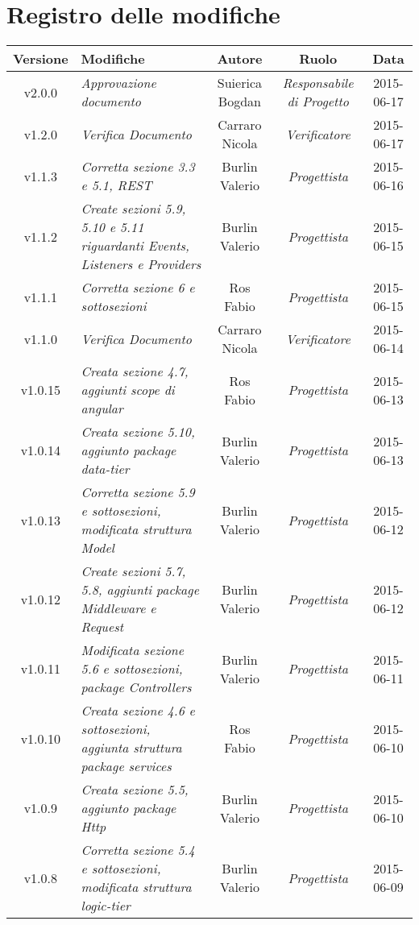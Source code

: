 \section*{Registro delle modifiche}

\begin{table}[h]
\centering
\begin{tabular}{|c|p{}|c|c|c|}
	\toprule
	\textbf{Versione} & \textbf{Modifiche} & \textbf{Autore} & \textbf{Ruolo} & \textbf{Data} \\
	\midrule
		v2.0.0 & \textit{Approvazione documento} & Suierica Bogdan & \textit{Responsabile di Progetto} & 2015-06-17\\
	\midrule
		v1.2.0 & \textit{Verifica Documento} & Carraro Nicola & \textit{Verificatore} & 2015-06-17\\
	\midrule
		v1.1.3 & \textit{Corretta sezione 3.3 e 5.1, REST} & Burlin Valerio & \textit{Progettista} & 2015-06-16\\
	\midrule
		v1.1.2 & \textit{Create sezioni 5.9, 5.10 e 5.11 riguardanti Events, Listeners e Providers} & Burlin Valerio & \textit{Progettista} & 2015-06-15\\
	\midrule
		v1.1.1 & \textit{Corretta sezione 6 e sottosezioni} & Ros Fabio & \textit{Progettista} & 2015-06-15\\
	\midrule
		v1.1.0 & \textit{Verifica Documento} & Carraro Nicola & \textit{Verificatore} & 2015-06-14\\
	\midrule
		v1.0.15 & \textit{Creata sezione 4.7, aggiunti scope di angular} & Ros Fabio & \textit{Progettista} & 2015-06-13\\
	\midrule
		v1.0.14 & \textit{Creata sezione 5.10, aggiunto package data-tier} & Burlin Valerio & \textit{Progettista} & 2015-06-13\\
	\midrule
		v1.0.13 & \textit{Corretta sezione 5.9 e sottosezioni, modificata struttura Model} & Burlin Valerio & \textit{Progettista} & 2015-06-12\\
	\midrule
		v1.0.12 & \textit{Create sezioni 5.7, 5.8, aggiunti package Middleware e Request} & Burlin Valerio & \textit{Progettista} & 2015-06-12\\
	\midrule
		v1.0.11 & \textit{Modificata sezione 5.6 e sottosezioni, package Controllers} & Burlin Valerio & \textit{Progettista} & 2015-06-11\\
	\midrule
		v1.0.10 & \textit{Creata sezione 4.6 e sottosezioni, aggiunta struttura package services} & Ros Fabio & \textit{Progettista} & 2015-06-10\\
	\midrule
		v1.0.9 & \textit{Creata sezione 5.5, aggiunto package Http} & Burlin Valerio & \textit{Progettista} & 2015-06-10\\
	\midrule
		v1.0.8 & \textit{Corretta sezione 5.4 e sottosezioni, modificata struttura logic-tier} & Burlin Valerio & \textit{Progettista} & 2015-06-09\\
	\bottomrule

\end{tabular}
\end{table}

